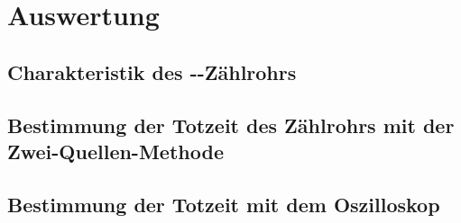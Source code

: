 
\section{Auswertung}

\subsection{Charakteristik des --Zählrohrs}

\subsection{Bestimmung der Totzeit des Zählrohrs mit der
  Zwei-Quellen-Methode}

\subsection{Bestimmung der Totzeit mit dem Oszilloskop}

